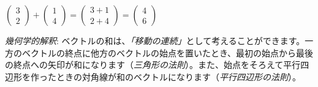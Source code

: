\begin{ex}
$\begin{pmatrix} 3 \\ 2 \end{pmatrix} + \begin{pmatrix} 1 \\ 4 \end{pmatrix} = \begin{pmatrix} 3 + 1 \\ 2 + 4 \end{pmatrix} = \begin{pmatrix} 4 \\ 6 \end{pmatrix}$
\end{ex}

\emph{幾何学的解釈}: ベクトルの和は、\emph{「移動の連続」}として考えることができます。一方のベクトルの終点に他方のベクトルの始点を置いたとき、最初の始点から最後の終点への矢印が和になります（\emph{三角形の法則}）。また、始点をそろえて平行四辺形を作ったときの対角線が和のベクトルになります（\emph{平行四辺形の法則}）。

